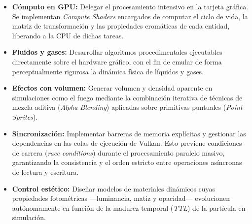 \begin{itemize}
    \item \textbf{Cómputo en GPU:} Delegar el procesamiento intensivo en la tarjeta gráfica. Se implementan \textit{Compute Shaders} encargados de computar el ciclo de vida, la matriz de transformación y las propiedades cromáticas de cada entidad, liberando a la CPU de dichas tareas.

    \item \textbf{Fluidos y gases:} Desarrollar algoritmos procedimentales ejecutables directamente sobre el hardware gráfico, con el fin de emular de forma perceptualmente rigurosa la dinámica física de líquidos y gases.                               

    \item \textbf{Efectos con volumen:} Generar volumen y densidad aparente en simulaciones como el fuego mediante la combinación iterativa de técnicas de mezcla aditiva (\textit{Alpha Blending}) aplicadas sobre primitivas puntuales (\textit{Point Sprites}).

    \item \textbf{Sincronización:} Implementar barreras de memoria explícitas y gestionar las dependencias en las colas de ejecución de Vulkan. Esto previene condiciones de carrera (\textit{race conditions}) durante el procesamiento paralelo masivo, garantizando la consistencia y el orden estricto entre operaciones asíncronas de lectura y escritura.

    \item \textbf{Control estético:} Diseñar modelos de materiales dinámicos cuyas propiedades fotométricas —luminancia, matiz y opacidad— evolucionen autónomamente en función de la madurez temporal (\textit{TTL}) de la partícula en simulación.
\end{itemize}